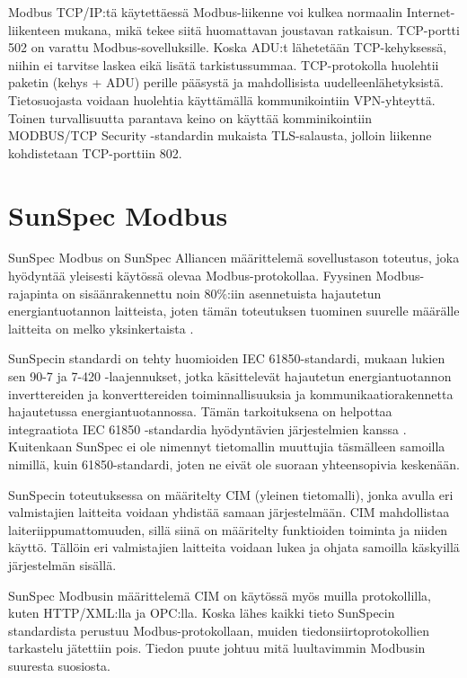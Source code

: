     Modbus TCP/IP:tä käytettäessä Modbus-liikenne voi kulkea normaalin Internet-liikenteen mukana, mikä tekee siitä huomattavan joustavan ratkaisun. TCP-portti 502 on varattu Modbus-sovelluksille.\parencite{modbusTCPIPSpec} Koska ADU:t lähetetään TCP-kehyksessä, niihin ei tarvitse laskea eikä lisätä tarkistussummaa. TCP-protokolla huolehtii paketin (kehys + ADU) perille pääsystä ja mahdollisista uudelleenlähetyksistä. Tietosuojasta voidaan huolehtia käyttämällä kommunikointiin \gls{VPN}-yhteyttä. Toinen turvallisuutta parantava keino on käyttää komminikointiin MODBUS/TCP Security -standardin mukaista TLS-salausta, jolloin liikenne kohdistetaan TCP-porttiin 802\parencite{modbusTCPIPTLSSpec}.

\section{SunSpec Modbus}
  SunSpec Modbus on SunSpec Alliancen määrittelemä sovellustason toteutus, joka hyödyntää yleisesti käytössä olevaa Modbus-protokollaa.  Fyysinen Modbus-rajapinta on sisäänrakennettu noin 80\%:iin asennetuista hajautetun energiantuotannon laitteista, joten tämän toteutuksen tuominen suurelle määrälle laitteita on melko yksinkertaista \parencite{SSFactSheet}.

  SunSpecin standardi on tehty huomioiden IEC 61850-standardi, mukaan lukien sen 90-7 ja 7-420 -laajennukset, jotka käsittelevät hajautetun energiantuotannon inverttereiden ja konverttereiden toiminnallisuuksia ja kommunikaatiorakennetta hajautetussa energiantuotannossa. Tämän tarkoituksena on helpottaa integraatiota IEC 61850 -standardia hyödyntävien järjestelmien kanssa \parencite{SSTech}. Kuitenkaan SunSpec ei ole nimennyt tietomallin muuttujia täsmälleen samoilla nimillä, kuin 61850-standardi, joten ne eivät ole suoraan yhteensopivia keskenään.

  SunSpecin toteutuksessa on määritelty CIM (yleinen tietomalli), jonka avulla eri valmistajien laitteita voidaan yhdistää samaan järjestelmään. CIM mahdollistaa laiteriippumattomuuden, sillä siinä on määritelty funktioiden toiminta ja niiden käyttö. Tällöin eri valmistajien laitteita voidaan lukea ja ohjata samoilla käskyillä järjestelmän sisällä.

  SunSpec Modbusin määrittelemä CIM on käytössä myös muilla protokollilla, kuten HTTP/XML:lla ja OPC:lla. Koska lähes kaikki tieto SunSpecin standardista perustuu Modbus-protokollaan, muiden tiedonsiirtoprotokollien tarkastelu jätettiin pois. Tiedon puute johtuu mitä luultavimmin Modbusin suuresta suosiosta.

